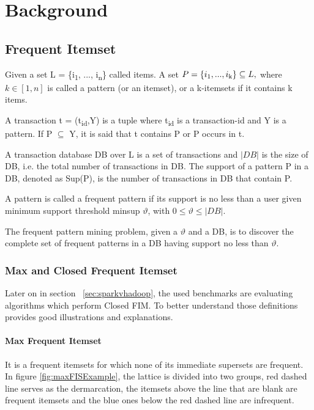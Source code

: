 \section{Background}
\subsection{Frequent Itemset}
Given a set L = \{i\textsubscript{1}, ..., i\textsubscript{n}\} called items. 
A set $P=\{i\textsubscript{1},...,i\textsubscript{k}\} \subseteq L,$ where $k \in [1,n] $ is called a pattern (or an itemset), or a k-itemsets if it contains k items. 

A transaction t = (t\textsubscript{id},Y) is a tuple where t\textsubscript{id} is a transaction-id and Y is a pattern. If P $\subseteq  $ Y, it is said that t contains P or P occurs in t. 

A transaction database DB over L is a set of transactions and $|DB|$ is the size of DB, i.e. the total number of transactions in DB. The support of a pattern P in a DB, denoted as Sup(P), is the number of transactions in DB that contain P. 

A pattern is called a frequent pattern if its support is no less than a user given minimum support threshold minsup $ \vartheta $, with $ 0 \leq \vartheta \leq |DB|$. 

The frequent pattern mining problem, given a $ \vartheta $ and a DB, is to discover the complete set of frequent patterns in a DB having support no less than $ \vartheta $. 

\subsubsection{Max and Closed Frequent Itemset}
Later on in section ~\ref{sec:sparkvhadoop}, the used benchmarks are evaluating algorithms which perform Closed FIM. To better understand those definitions ~\cite{dataminingbook} provides good illustrations and explanations.

\paragraph{Max Frequent Itemset}
It is a frequent itemsets for which none of its immediate supersets are frequent. In figure \ref{fig:maxFISExample}, the lattice is divided into two groups, red dashed line serves as the dermarcation, the itemsets above the line that are blank are frequent itemsets and the blue ones below the red dashed line are infrequent.


